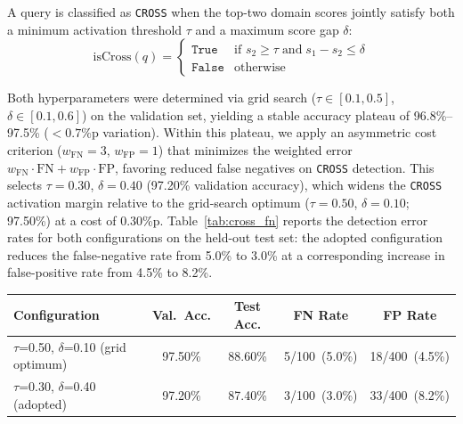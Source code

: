 \documentclass[a4paper,fleql]{cas-sc}
\begin{document}
A query is classified as \texttt{CROSS} when the top-two domain scores
jointly satisfy both a minimum activation threshold $\tau$ and a maximum
score gap $\delta$:
\begin{equation}
    \text{isCross}(q) =
    \begin{cases}
        \texttt{True}  & \text{if } s_2 \geq \tau \;\text{and}\;
                         s_1 - s_2 \leq \delta \\
        \texttt{False} & \text{otherwise}
    \end{cases}
    \label{eq:cross_detect}
\end{equation}

Both hyperparameters were determined via grid search
($\tau \in [0.1, 0.5]$, $\delta \in [0.1, 0.6]$) on the validation set,
yielding a stable accuracy plateau of 96.8\%--97.5\% ($<0.7$\%p variation).
Within this plateau, we apply an asymmetric cost criterion
($w_{\text{FN}}=3$, $w_{\text{FP}}=1$) that minimizes the weighted error
$w_{\text{FN}} \cdot \text{FN} + w_{\text{FP}} \cdot \text{FP}$, favoring
reduced false negatives on \texttt{CROSS} detection. This selects
$\tau = 0.30$, $\delta = 0.40$ (97.20\% validation accuracy), which widens
the \texttt{CROSS} activation margin relative to the grid-search optimum
($\tau = 0.50$, $\delta = 0.10$; 97.50\%) at a cost of 0.30\%p.
Table~\ref{tab:cross_fn} reports the detection error rates for both
configurations on the held-out test set: the adopted configuration reduces
the false-negative rate from 5.0\% to 3.0\% at a corresponding increase in
false-positive rate from 4.5\% to 8.2\%.

\vspace{4pt}
\begin{center}
\begingroup
{}
\label{tab:cross_fn}
\begin{tabular}{lcccc}
\toprule
\textbf{Configuration} & \textbf{Val.\ Acc.} & \textbf{Test Acc.} & \textbf{FN Rate} & \textbf{FP Rate} \\
\midrule
$\tau$=0.50, $\delta$=0.10 (grid optimum) & 97.50\% & 88.60\% & 5/100\ (5.0\%) & 18/400\ (4.5\%) \\
$\tau$=0.30, $\delta$=0.40 (adopted)      & 97.20\% & 87.40\% & 3/100\ (3.0\%) & 33/400\ (8.2\%) \\
\bottomrule
\end{tabular}
\endgroup
\end{center}
\vspace{4pt}
\end{document}
